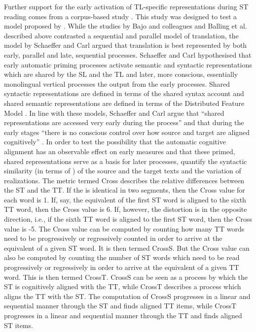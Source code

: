 \documentclass[output=paper]{LSP/langsci}
\begin{document}
Further support for the early activation of TL-specific representations during ST reading comes from a corpus-based  study \citep{Schaeffer2016Word}. This study was designed to test a model proposed by \citet{SchaefferCarl2013}. While the studies by Bajo and colleagues and Balling et al. described above contrasted a sequential and parallel model of translation, the model by Schaeffer and Carl argued that translation is best represented by both early, parallel and late, sequential processes. Schaeffer and Carl hypothesised that early automatic priming processes activate semantic and syntactic representations which are shared by the SL and the TL and later, more conscious, essentially monolingual vertical processes  the output from the early processes. Shared syntactic representations are defined in terms of the shared syntax account \citep{Hartsuiker2004} and shared semantic representations are defined in terms of the Distributed Feature Model \citep{DeGroot1992Determinants}. In line with these models, Schaeffer and Carl argue that ``shared representations are accessed very early during the process'' \citep[174]{SchaefferCarl2013} and that during the early stages ``there is no conscious control over how source and target are aligned cognitively'' \citep[173]{SchaefferCarl2013}.
In order to test the possibility that the automatic cognitive alignment has an observable effect on early  measures and that these primed, shared representations serve as a basis for later processes, \citet[189]{Schaeffer2016Word} quantify the syntactic similarity (in terms of ) of the source and the target texts and the variation of  realizations. The metric termed Cross \citep[26]{Carl2016CRITT} describes the relative  differences between the ST and the TT. If the  is identical in two segments, then the Cross value for each word is 1. If, say, the equivalent of the first ST word is aligned to the sixth TT word, then the Cross value is 6. If, however, the distortion is in the opposite direction, i.e., if the sixth TT word is aligned to the first ST word, then the Cross value is -5. The Cross value can be computed by counting how many TT words need to be progressively or regressively counted in order to arrive at the equivalent of a given ST word. It is then termed CrossS. But the Cross value can also be computed by counting the number of ST words which need to be read progressively or regressively in order to arrive at the equivalent of a given TT word. This is then termed CrossT. CrossS can be seen as a process by which the ST is cognitively aligned with the TT, while CrossT describes a process which aligns the TT with the ST. The computation of CrossS progresses in a linear and sequential manner through the ST and finds aligned TT items, while CrossT progresses in a linear and sequential manner through the TT and finds aligned ST items.
\end{document}
